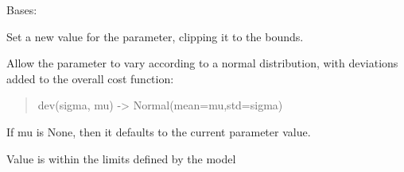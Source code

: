 \documentclass[letterpaper,10pt,english]{sphinxmanual}
\begin{document}
\begin{fulllineitems}
\label{api/mystic.parameter:refl1d.mystic.parameter.VectorParameter}
Bases: {\hyperref[api/mystic.parameter:refl1d.mystic.parameter.Parameter]{}}

\begin{fulllineitems}
\label{api/mystic.parameter:refl1d.mystic.parameter.VectorParameter.clip_set}
Set a new value for the parameter, clipping it to the bounds.

\end{fulllineitems}


\begin{fulllineitems}
\label{api/mystic.parameter:refl1d.mystic.parameter.VectorParameter.default}
\end{fulllineitems}


\begin{fulllineitems}
\label{api/mystic.parameter:refl1d.mystic.parameter.VectorParameter.dev}
Allow the parameter to vary according to a normal distribution, with
deviations added to the overall cost function:
\begin{quote}

dev(sigma, mu) -\textgreater{} Normal(mean=mu,std=sigma)
\end{quote}

If mu is None, then it defaults to the current parameter value.

\end{fulllineitems}


\begin{fulllineitems}
\label{api/mystic.parameter:refl1d.mystic.parameter.VectorParameter.feasible}
Value is within the limits defined by the model


\end{fulllineitems}
\end{fulllineitems}
\end{document}
